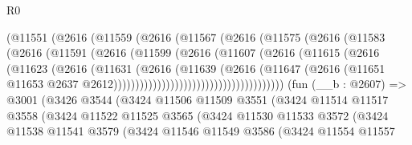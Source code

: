\begin{lexlean}{R0}
\begin{coremodule}
                            (@11551
                              (@2616
                                (@11559
                                  (@2616
                                    (@11567
                                      (@2616
                                        (@11575
                                          (@2616
                                            (@11583
                                              (@2616
                                                (@11591
                                                  (@2616
                                                    (@11599
                                                      (@2616
                                                        (@11607
                                                          (@2616
                                                            (@11615
                                                              (@2616
                                                                (@11623
                                                                  (@2616
                                                                    (@11631
                                                                      (@2616
                                                                        (@11639
                                                                          (@2616
                                                                            (@11647
                                                                              (@2616
                                                                                (@11651
                                                                                  @11653
                                                                                  @2637
                                                                                  @2612)))))))))))))))))))))))))))))))))))))))
    (fun (__b : @2607) =>
    @3001
      (@3426
        @3544
        (@3424
          @11506
          @11509
          @3551
          (@3424
            @11514
            @11517
            @3558
            (@3424
              @11522
              @11525
              @3565
              (@3424
                @11530
                @11533
                @3572
                (@3424
                  @11538
                  @11541
                  @3579
                  (@3424
                    @11546
                    @11549
                    @3586
                    (@3424
                      @11554
                      @11557

\end{coremodule}
\end{lexlean}

